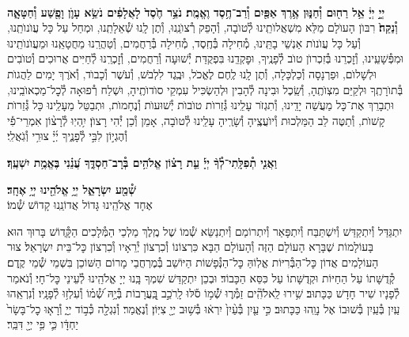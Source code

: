 \documentclass[twoside, openany, parskip=half, 11pt]{book}
\begin{document}
\begin{sometimes}

\\
 \textbf{יְיָ֣ יְיָ֔ אֵ֥ל רַח֖וּם וְ֯חַנּ֑וּן אֶ֥רֶךְ אַפַּ֖יִם וְ֯רַב־חֶ֥סֶד וֶאֱמֶֽת׃ נֹצֵ֥ר חֶ֙סֶד֙ לָאֲלָפִ֔ים נֹשֵׂ֥א עָוֺ֛ן וָפֶ֖שַׁע וְ֯חַטָּאָ֑ה וְ֯נַקֵּה֙׃}
רִבּוֺן הָעוׂלָם מַלֵּא מִשְׁאֲלוׂתֵֽינוּ לְ֯טוׂבָה, וְ֯הָפֵק רְ֯צוׂנֵֽנוּ, וְ֯תֶן לָֽנוּ שְׁ֯אֵלָתֵֽנוּ, וּמְחַל עַל כָּל עֲוׂנוׂתֵֽנוּ, וְ֯עַל כָּל עֲוׂנוׂת אַנְשֵׁי בָתֵּֽינוּ, מְ֯חִילָה בְּ֯חֶֽסֶד, מְ֯חִילָה בְּ֯רַחֲמִים, וְ֯טַהֲרֵֽנוּ מֵחֲטָאֵֽנוּ וּמֵעֲוׂנוׂתֵֽינוּ וּמִפְּ֯שָׁעֵֽינוּ, וְ֯זׇכְרֵנוּ בְּ֯זִכְרוׂן טוׂב לְ֯פָנֶֽיךָ, וּפׇקְדֵֽנוּ בִּפְקֻדַּת יְ֯שׁוּעָה וְ֯רַחֲמִים, וְ֯זׇכְרֵֽנוּ לְ֯חַיִּים אֲרוּכִים וְ֯טוׂבִים וּלְשָׁלוׂם, וּפַרְנָסָה וְ֯כַלְכָּלָה, וְ֯תֶן לָֽנוּ לֶֽחֶם לֶאֱכׂל, וּבֶֽגֶד לִלְבּׂשׁ, וְ֯עׂשֶׁר וְ֯כָבוׂד, וְ֯אׂרֶךְ יָמִים לַהֲגוׂת בְּ֯תוׂרָתֶֽךָ וּלְקַיֵּם מִצְוׂתֶֽהָ, וְ֯שֵֽׂכֶל וּבִינָה לְ֯הָבִין וּלְהַשְׂכִּיל עִמְקֵי סוׂדוׂתֶֽיהָ, וּשְׁלַח רְ֯פוּאָה לְ֯כׇל־מַכְאוׂבֵֽינוּ, וּתְבָרֵךְ אֶת־כָּל מַעֲשֵׁה יָדֵֽינוּ, וְ֯תִגְזׂר עָלֵֽינוּ גְּ֯זֵרוׂת טוׂבוׂת יְ֯שׁוּעוׂת וְ֯נֶחָמוׂת, וּתְבַטֵּל מֵעָלֵֽינוּ כָּל גְּ֯זֵרוׂת קָשׁוׂת, וְ֯תַטֶּה לֵב הַמַּלְכוּת וְ֯יוׂעֲצֶֽיהָ וְ֯שָׂרֶֽיהָ עָלֵֽינוּ לְ֯טוׂבָה, אָמֵן וְ֯כֵן יְ֯הִי רָצוׂן׃
%
יִ֥הְיֽוּ לְ֯רָצ֨וֹן אִמְרֵי־פִ֡י וְ֯הֶגְי֣וֹן לִבִּ֣י לְ֯פָנֶ֑יךָ יְ֜יָ֗ צוּרִ֥י וְ֯גֹֽאֲלִֽי׃


\textbf{וַאֲנִ֤י תְ֯פִלָּֽתִי־לְ֯ךָ֨ יְיָ֡ עֵ֤ת רָצ֗וֹן אֱלֹהִ֥ים בְּ֯רָב־חַסְדֶּ֑ךָ עֲ֝נֵ֗נִי בֶּאֱמֶ֥ת יִשְׁעֶֽךָ׃}

\end{sometimes}

\brikhshmei

\textbf{שְׁ֯מַ֖ע יִשְׂרָאֵ֑ל יְיָ֥ אֱלֹהֵ֖ינוּ יְיָ֥ אֶחָֽד׃}\\

אֶחָד אֱלֹהֵֽינוּ גָּדוֹל אֲדוֹנֵֽנוּ קָדוֹשׁ שְׁ֯מוֹ׃

\gadlu

\label{al hakol}
יִתְגַּדַּל וְ֯יִתְקַדַּשׁ וְ֯יִשְׁתַּבַּח וְ֯יִתְפָּאַר וְ֯יִתְרוֹמַם וְ֯יִתְנַשֵּׂא שְׁ֯מוֹ שֶׁל מֶֽלֶךְ מַלְכֵי הַמְּ֯לָכִים הַקְָּ֯דוֹשׁ בָּרוּךְ הוּא בָּעוֹלָמוֹת שֶׁבָּרָא הָעוֹלָם הַזֶּה וְ֯הָעוֹלָם הַבָּא כִּרְצוֹנוֹ וְ֯כִרְצוֹן יְ֯רֵאָיו וְ֯כִרְצוֹן כׇּל־בֵּית יִשְׂרָאֵל׃ צוּר הָעוֹלָמִים אֲדוֹן כׇּל־הַבְּ֯רִיּוֹת אֱלֽוֹהַּ כׇּל־הַנְּ֯פָשׁוֹת הַיּוֹשֵׁב בְּ֯מֶרְחֲבֵי מָרוֹם הַשּׁוֹכֵן בִּשְׁמֵי שְׁ֯מֵי קֶֽדֶם׃ קְ֯דֻשָּׁתוֹ עַל הַחַיּוֹת וּקְדֻשָּׁתוֹ עַל כִּסֵּא הַכָּבוֹד׃ וּבְכֵן יִתְקַדַּשׁ שִׁמְךָ בָּֽנוּ יְיָ אֱלֹהֵֽינוּ לְ֯עֵינֵי כׇּל־חָי׃ וְ֯נֹאמַר לְ֯פָנָיו שִׁיר חָדָשׁ כַּכָּתוּב׃
שִׁ֥ירוּ לֵֽאלֹהִֽ֘ים זַמְּ֯ר֢וּ שְׁ֯֫מ֥וֹ סֹ֡לּוּ לָֽרֹכֵ֣ב בָּֽ֭עֲרָבוֹת בְּ֯יָ֥הּ שְׁ֯֝מ֗וֹ וְ֯עִלְז֥וּ לְ֯פָנָֽיו׃ וְ֯נִרְאֵֽהוּ עַֽיִן בְּ֯עַֽיִן בְּ֯שׁוּבוֹ אֶל נָוֵֽהוּ כַּכָּתוּב׃
%
כִּ֣י עַ֤יִן בְּ֯עַ֨יִן֙ יִרְא֔וּ בְּ֯שׁ֥וּב יְיָ֖ צִיּֽוֹן׃ וְ֯נֶאֱמַר׃
וְ֯נִגְלָ֖ה כְּ֯ב֣וֹד יְיָ֑ וְ֯רָא֤וּ כׇל־בָּשָׂר֙ יַחְדָּ֔ו כִּ֛י פִּ֥י יְיָ֖ דִּבֵּֽר׃
\end{document}
